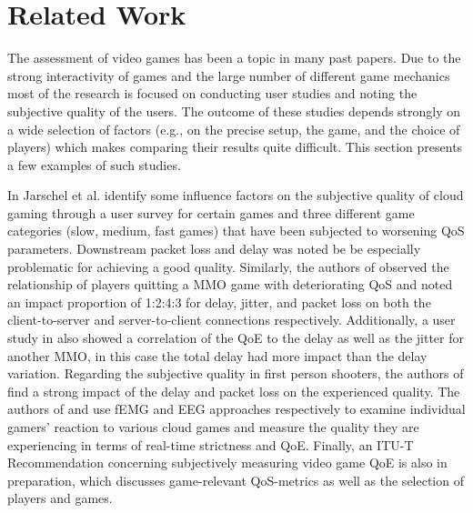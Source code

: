 \section{Related Work}
\label{sec:relatedwork}


The assessment of video games has been a topic in many past papers. Due to the strong interactivity of games and the large number of different game mechanics most of the research is focused on conducting user studies and noting the subjective quality of the users. The outcome of these studies depends strongly on a wide selection of factors (e.g., on the precise setup, the game, and the choice of players) which makes comparing their results quite difficult. This section presents a few examples of such studies.

In \cite{5976180} Jarschel et al. identify some influence factors on the subjective quality of cloud gaming through a user survey for certain games and three different game categories (slow, medium, fast games) that have been subjected to worsening \gls{QoS} parameters. Downstream packet loss and delay was noted be be especially problematic for achieving a good quality. Similarly, the authors of \cite{4591393} observed the relationship of players quitting a \gls{MMO} game with deteriorating \gls{QoS} and noted an impact proportion of 1:2:4:3 for delay, jitter, and packet loss on both the client-to-server and server-to-client connections respectively. Additionally, a user study in \cite{4604397} also showed a correlation of the \gls{QoE} to the delay as well as the jitter for another \gls{MMO}, in this case the total delay had more impact than the delay variation. Regarding the subjective quality in first person shooters, the authors of \cite{6614351} find a strong impact of the delay and packet loss on the experienced quality. The authors of \cite{6404025} and \cite{beyerusing} use \gls{fEMG} and \gls{EEG} approaches respectively to examine individual gamers' reaction to various cloud games and measure the quality they are experiencing in terms of real-time strictness and \gls{QoE}. Finally, an ITU-T Recommendation \cite{mollertowards} concerning subjectively measuring video game \gls{QoE} is also in preparation, which discusses game-relevant \gls{QoS}-metrics as well as the selection of players and games.

